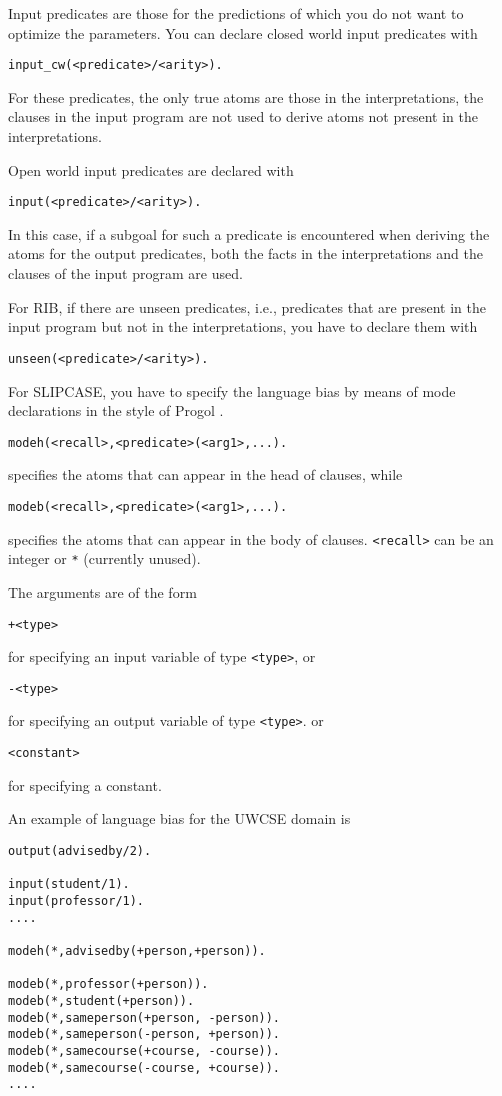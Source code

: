 \documentclass[a4paper,10pt]{article}
\newcommand{\href}[2]{\Link[#1]{}{} #2 \EndLink}
\begin{document}
Input predicates are those for the predictions of which you do not want to optimize the parameters. You can declare closed world input predicates with
\begin{verbatim}
input_cw(<predicate>/<arity>).
\end{verbatim}
For these predicates, the only true atoms are those in the interpretations, the clauses in the input program are not used to derive atoms not present in the interpretations.

Open world input predicates are declared with
\begin{verbatim}
input(<predicate>/<arity>).
\end{verbatim}
In this case, if a subgoal for such a predicate is encountered when deriving the atoms for the output predicates, 
both the facts in the interpretations and the clauses of the input program are used.

For RIB, if there are unseen predicates, i.e., predicates that are present in the input program but not in the interpretations, you have to declare them with
\begin{verbatim}
unseen(<predicate>/<arity>).
\end{verbatim}

For SLIPCASE, you have to specify the language bias by means of mode declarations in the style of 
\href{http://www.doc.ic.ac.uk/\string ~shm/progol.html}{Progol}.
\begin{verbatim}
modeh(<recall>,<predicate>(<arg1>,...).
\end{verbatim}
specifies the atoms that can appear in the head of clauses, while
\begin{verbatim}
modeb(<recall>,<predicate>(<arg1>,...).
\end{verbatim}
specifies the atoms that can appear in the body of clauses.
\texttt{<recall>} can be an integer or \texttt{*} (currently unused).

The arguments are of the form
\begin{verbatim}
+<type>
\end{verbatim}
for specifying an input variable of type \texttt{<type>}, or 
\begin{verbatim}
-<type>
\end{verbatim}
for specifying an output variable of type \texttt{<type>}. or
\begin{verbatim}
<constant>
\end{verbatim}
for specifying a constant.

An example of language bias for the UWCSE domain is
\begin{verbatim}
output(advisedby/2).

input(student/1).
input(professor/1).
....

modeh(*,advisedby(+person,+person)). 

modeb(*,professor(+person)).
modeb(*,student(+person)).
modeb(*,sameperson(+person, -person)). 
modeb(*,sameperson(-person, +person)). 
modeb(*,samecourse(+course, -course)). 
modeb(*,samecourse(-course, +course)). 
....
\end{verbatim}
\end{document}
